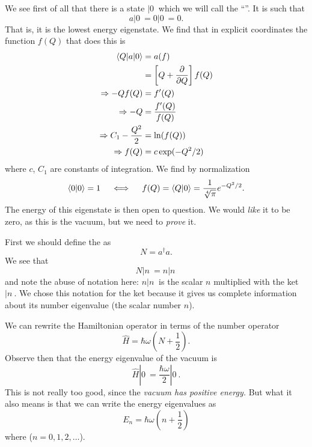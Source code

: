 
We see first of all that there is a state $|0\>$ which we will
call the ``''. It is such that
\begin{equation}%
a|0\>=0|0\>=0.
\end{equation}
That is, it is the lowest energy eigenstate. We find that in
explicit coordinates the function $f(Q)$ that does this is
\begin{subequations}
\begin{align}
\langle Q|a|0\rangle &= a(f) \\
&= \left[Q+\frac{\partial}{\partial Q}\right]f(Q)\\
\Rightarrow -Qf(Q) &= f'(Q)\\
\Rightarrow -Q &= \frac{f'(Q)}{f(Q)}\\
\Rightarrow C_{1} - \frac{Q^{2}}{2} &= \ln(f(Q))\\
\Rightarrow f(Q) &= c\exp(-Q^{2}/2)
\end{align}
\end{subequations}
where $c$, $C_{1}$ are constants of integration. We find by
normalization
\begin{equation}%
\<0|0\>=1\quad\iff\quad f(Q)= \<Q|0\> = \frac{1}{\sqrt[4]{\pi}}e^{-Q^{2}/2}.
\end{equation}
The energy of this eigenstate is then open to question. We would
\emph{like} it to be zero, as this is the vacuum, but we need to
\emph{prove} it.

First we should define the  as
\begin{equation}%
N = a^{\dag}a.
\end{equation}
We see that
\begin{equation}%
N|n\> = n|n\>
\end{equation}
and note the abuse of notation here: $n|n\>$ is the scalar $n$
multiplied with the ket $|n\>$. We chose this notation for the
ket because it gives us complete information about its number
eigenvalue (the scalar number $n$).

We can rewrite the Hamiltonian operator in terms of the number
operator
\begin{equation}%
\widehat{H} = \hbar\omega\left(N+\frac{1}{2}\right).
\end{equation}
Observe then that the energy eigenvalue of the vacuum is
\begin{equation}%
\widehat{H}|0\> = \frac{\hbar\omega}{2}|0\>.
\end{equation}
This is not really too good, since the \emph{vacuum has positive
  energy.} But what it also means is that we can write the energy
eigenvalues as
\begin{equation}%
E_{n} = \hbar\omega\left(n+\frac{1}{2}\right)
\end{equation}
where ($n=0,1,2,\ldots$).
